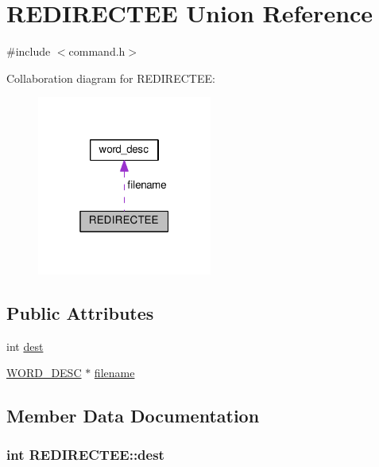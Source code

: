 \hypertarget{unionREDIRECTEE}{}\section{R\+E\+D\+I\+R\+E\+C\+T\+EE Union Reference}
\label{unionREDIRECTEE}


{\ttfamily \#include $<$command.\+h$>$}



Collaboration diagram for R\+E\+D\+I\+R\+E\+C\+T\+EE\+:
\nopagebreak
\begin{figure}[H]
\begin{center}
\leavevmode
\includegraphics[width=163pt]{unionREDIRECTEE__coll__graph}
\end{center}
\end{figure}
\subsection*{Public Attributes}
\begin{DoxyCompactItemize}
\item 
int \hyperlink{unionREDIRECTEE_a241f08d773699e8d21de269b4644cbbd}{dest}
\item 
\hyperlink{command_8h_a3f0cccf333703e5f6c4168be0db675fa}{W\+O\+R\+D\+\_\+\+D\+E\+SC} $\ast$ \hyperlink{unionREDIRECTEE_a5149629ee488bbd339dd6d7dbe38f212}{filename}
\end{DoxyCompactItemize}


\subsection{Member Data Documentation}
\subsubsection[{\texorpdfstring{dest}{dest}}]{\setlength{\rightskip}{0pt plus 5cm}int R\+E\+D\+I\+R\+E\+C\+T\+E\+E\+::dest}\hypertarget{unionREDIRECTEE_a241f08d773699e8d21de269b4644cbbd}{}\label{unionREDIRECTEE_a241f08d773699e8d21de269b4644cbbd}
